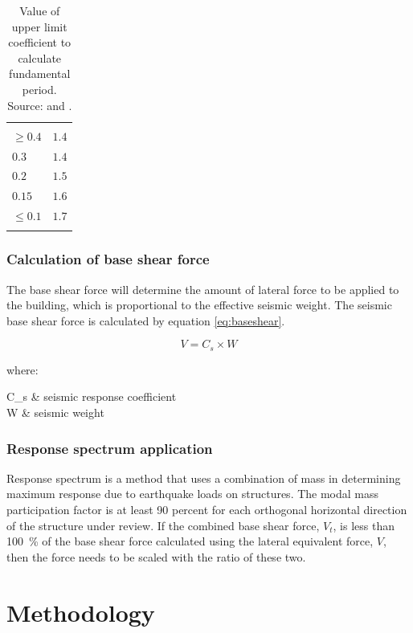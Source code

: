 \documentclass{cup-pan}
\makeatletter
\newenvironment{conditions*}
  {\par\vspace{\abovedisplayskip}\noindent
   \tabularx{\columnwidth}{>{$}l<{$} @{${}={}$} >{\raggedright\arraybackslash}X}}
  {\endtabularx\par\vspace{\belowdisplayskip}}
\makeatother
\begin{document}
\renewcommand{\arraystretch}{1}
\begin{longtable}{P{1in} P{1in}}
\caption{Value of upper limit coefficient to calculate fundamental period. Source: \cite{sni172720} and \cite{asce}.}\\
\headrow {} &   \\
$\geq 0.4$ & $1.4$ \\
$0.3$ & $1.4$ \\
$0.2$ & $1.5$ \\
$0.15$ & $1.6$ \\
$\leq 0.1$ & $1.7$ \\
\label{tab:cu}
\end{longtable}

\subsubsection{Calculation of base shear force}
The base shear force will determine the amount of lateral force to be applied to the building, which is proportional to the effective seismic weight. The seismic base shear force is calculated by equation \ref{eq:baseshear}.

\begin{equation}
V = C_s \times W
\label{eq:baseshear}
\end{equation}

\noindent where:

\begin{conditions*}
C_s    &  seismic response coefficient\\
W & seismic weight \\
\end{conditions*}

\subsubsection{Response spectrum application}
\label{subsub: appresponsespectrum}
Response spectrum is a method that uses a combination of mass in determining maximum response due to earthquake loads on structures. The modal mass participation factor is at least 90 percent for each orthogonal horizontal direction of the structure under review. If the combined base shear force, $V_t$, is less than \SI{100}{\percent} of the base shear force calculated using the lateral equivalent force, $V$, then the force needs to be scaled with the ratio of these two.

\section{Methodology}
\label{sec:method}
\end{document}

